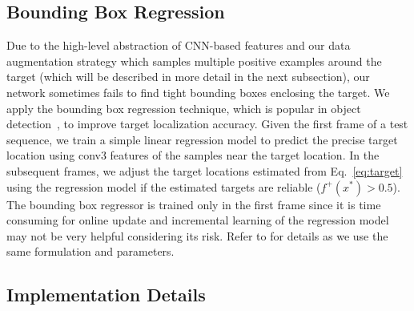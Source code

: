 \documentclass[10pt,twocolumn,letterpaper]{article}
\begin{document}
\subsection{Bounding Box Regression}
Due to the high-level abstraction of CNN-based features and our data augmentation strategy which samples multiple positive examples around the target (which will be described in more detail in the next subsection), our network sometimes fails to find tight bounding boxes enclosing the target.
We apply the bounding box regression technique, which is popular in object detection~\cite{girshick2014rich,felzenszwalb2010object}, to improve target localization accuracy.
Given the first frame of a test sequence, we train a simple linear regression model to predict the precise target location using conv3 features of the samples near the target location.
In the subsequent frames, we adjust the target locations estimated from Eq.~\eqref{eq:target} using the regression model if the estimated targets are reliable (\ie $f^+(x^*)>0.5$).
The bounding box regressor is trained only in the first frame since it is time consuming for online update and incremental learning of the regression model may not be very helpful considering its risk.
Refer to \cite{girshick2014rich} for details as we use the same formulation and parameters. 


\subsection{Implementation Details}
\label{sub:implementation}
\end{document}
